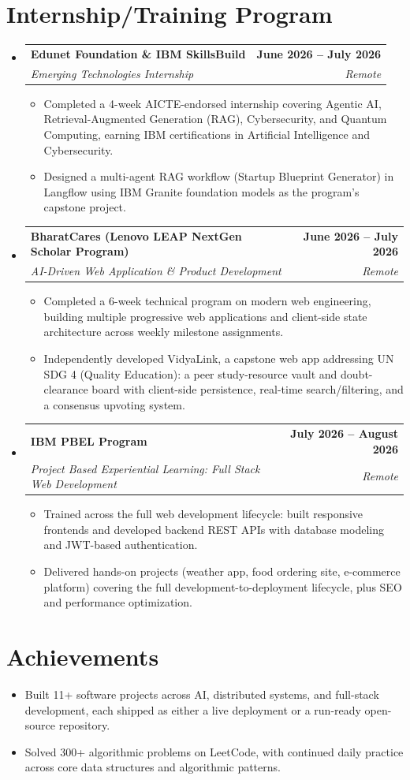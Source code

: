 \documentclass[letterpaper,10pt]{article}
\makeatletter
\newcommand{\resumeItem}[1]{
  \item\small{
    {#1 \vspace{-2pt}}
  }
}
\newcommand{\resumeSubheading}[4]{
  \vspace{-2pt}\item
    \begin{tabular*}{1.0\textwidth}[t]{l@{\extracolsep{\fill}}r}
      \textbf{#1} & \textbf{\small #2} \\
      \textit{\small#3} & \textit{\small #4} \\
    \end{tabular*}\vspace{-7pt}
}
\newcommand{\resumeSubHeadingListStart}{\begin{itemize}[leftmargin=0.0in, label={}]}
\newcommand{\resumeSubHeadingListEnd}{\end{itemize}}
\newcommand{\resumeItemListStart}{\begin{itemize}}
\newcommand{\resumeItemListEnd}{\end{itemize}\vspace{-5pt}}
\makeatother
\begin{document}
\section{Internship/Training Program}
  \resumeSubHeadingListStart
    \resumeSubheading
      {Edunet Foundation \& IBM SkillsBuild}{June 2026 -- July 2026}
      {Emerging Technologies Internship}{Remote}
      \resumeItemListStart
        \resumeItem{Completed a 4-week AICTE-endorsed internship covering Agentic AI, Retrieval-Augmented Generation (RAG), Cybersecurity, and Quantum Computing, earning IBM certifications in Artificial Intelligence and Cybersecurity.}
        \resumeItem{Designed a multi-agent RAG workflow (Startup Blueprint Generator) in Langflow using IBM Granite foundation models as the program's capstone project.}
      \resumeItemListEnd
    \resumeSubheading
      {BharatCares (Lenovo LEAP NextGen Scholar Program)}{June 2026 -- July 2026}
      {AI-Driven Web Application \& Product Development}{Remote}
      \resumeItemListStart
        \resumeItem{Completed a 6-week technical program on modern web engineering, building multiple progressive web applications and client-side state architecture across weekly milestone assignments.}
        \resumeItem{Independently developed VidyaLink, a capstone web app addressing UN SDG 4 (Quality Education): a peer study-resource vault and doubt-clearance board with client-side persistence, real-time search/filtering, and a consensus upvoting system.}
      \resumeItemListEnd
    \resumeSubheading
      {IBM PBEL Program}{July 2026 -- August 2026}
      {Project Based Experiential Learning: Full Stack Web Development}{Remote}
      \resumeItemListStart
        \resumeItem{Trained across the full web development lifecycle: built responsive frontends and developed backend REST APIs with database modeling and JWT-based authentication.}
        \resumeItem{Delivered hands-on projects (weather app, food ordering site, e-commerce platform) covering the full development-to-deployment lifecycle, plus SEO and performance optimization.}
      \resumeItemListEnd
  \resumeSubHeadingListEnd
\vspace{-12pt}

\section{Achievements}
      \resumeItemListStart
\resumeItem{Built 11+ software projects across AI, distributed systems, and full-stack development, each shipped as either a live deployment or a run-ready open-source repository.}
  \vspace{-16pt}
\resumeItem{Solved 300+ algorithmic problems on LeetCode, with continued daily practice across core data structures and algorithmic patterns.}
     \resumeItemListEnd
\end{document}
